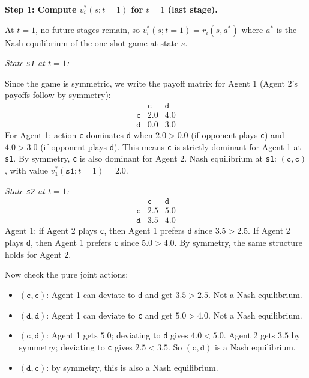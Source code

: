 \begin{solution}
\textbf{Step 1: Compute $v_i^*(s; t=1)$ for $t=1$ (last stage).}

At $t=1$, no future stages remain, so $v_i^*(s;t=1) = r_i(s, a^*)$ where $a^*$ is the Nash equilibrium of the one-shot game at state $s$.

\medskip
\noindent \textit{State \texttt{s1} at $t=1$:}

Since the game is symmetric, we write the payoff matrix for Agent 1 (Agent 2's payoffs follow by symmetry):
\[
\begin{array}{c|cc}
 & \texttt{c} & \texttt{d} \\\hline
\texttt{c} & 2.0 & 4.0 \\
\texttt{d} & 0.0 & 3.0
\end{array}
\]
For Agent 1: action \texttt{c} dominates \texttt{d} when $2.0 > 0.0$ (if opponent plays \texttt{c}) and $4.0 > 3.0$ (if opponent plays \texttt{d}). This means \texttt{c} is strictly dominant for Agent 1 at \texttt{s1}. By symmetry, \texttt{c} is also dominant for Agent 2. Nash equilibrium at \texttt{s1}: $(\texttt{c},\texttt{c})$, with value $v_1^*(\texttt{s1};t=1) = 2.0$.

\medskip
\noindent \textit{State \texttt{s2} at $t=1$:}
\[
\begin{array}{c|cc}
 & \texttt{c} & \texttt{d} \\\hline
\texttt{c} & 2.5 & 5.0 \\
\texttt{d} & 3.5 & 4.0
\end{array}
\]
Agent 1: if Agent 2 plays \texttt{c}, then Agent 1 prefers \texttt{d} since $3.5 > 2.5$. If Agent 2 plays \texttt{d}, then Agent 1 prefers \texttt{c} since $5.0 > 4.0$. By symmetry, the same structure holds for Agent 2.

Now check the pure joint actions:
\begin{itemize}
  \item $(\texttt{c},\texttt{c})$: Agent 1 can deviate to \texttt{d} and get $3.5 > 2.5$. Not a Nash equilibrium.
  \item $(\texttt{d},\texttt{d})$: Agent 1 can deviate to \texttt{c} and get $5.0 > 4.0$. Not a Nash equilibrium.
  \item $(\texttt{c},\texttt{d})$: Agent 1 gets $5.0$; deviating to \texttt{d} gives $4.0 < 5.0$. Agent 2 gets $3.5$ by symmetry; deviating to \texttt{c} gives $2.5 < 3.5$. So $(\texttt{c},\texttt{d})$ is a Nash equilibrium.
  \item $(\texttt{d},\texttt{c})$: by symmetry, this is also a Nash equilibrium.
\end{itemize}


\end{solution}
